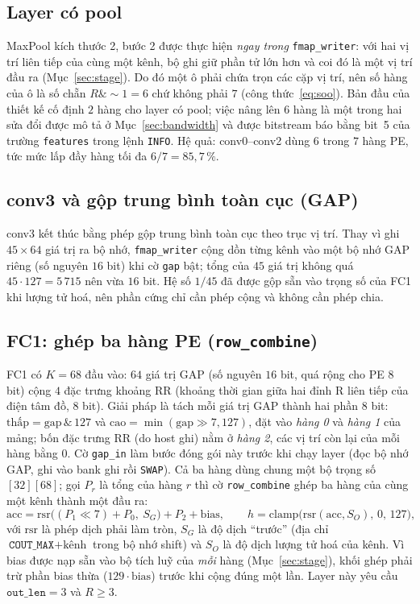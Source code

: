 \subsection{Layer có pool}
MaxPool kích thước 2, bước 2 được thực hiện \emph{ngay trong} \texttt{fmap\_writer}: với hai vị trí liên tiếp của cùng một kênh, bộ ghi giữ phần tử lớn hơn và coi đó là một vị trí đầu ra (Mục~\ref{sec:stage}).
Do đó một ô phải chứa trọn các cặp vị trí, nên số hàng của ô là số chẵn $R\mathbin{\&}{\sim}1=6$ chứ không phải $7$ (công thức~\eqref{eq:soo}).
Bản đầu của thiết kế cố định $2$ hàng cho layer có pool; việc nâng lên $6$ hàng là một trong hai sửa đổi được mô tả ở Mục~\ref{sec:bandwidth} và được bitstream báo bằng bit~5 của trường \texttt{features} trong lệnh \texttt{INFO}.
Hệ quả: conv0--conv2 dùng $6$ trong $7$ hàng PE, tức mức lấp đầy hàng tối đa $6/7=85{,}7\,\%$.

\subsection{conv3 và gộp trung bình toàn cục (GAP)}
conv3 kết thúc bằng phép gộp trung bình toàn cục theo trục vị trí.
Thay vì ghi $45\times64$ giá trị ra bộ nhớ, \texttt{fmap\_writer} cộng dồn từng kênh vào một bộ nhớ GAP riêng (số nguyên $16$ bit) khi cờ \texttt{gap} bật; tổng của $45$ giá trị không quá $45\cdot127=5\,715$ nên vừa $16$ bit.
Hệ số $1/45$ đã được gộp sẵn vào trọng số của FC1 khi lượng tử hoá, nên phần cứng chỉ cần phép cộng và không cần phép chia.

\subsection{FC1: ghép ba hàng PE (\texttt{row\_combine})}
FC1 có $K=68$ đầu vào: $64$ giá trị GAP (số nguyên $16$ bit, quá rộng cho PE $8$ bit) cộng $4$ đặc trưng khoảng RR (khoảng thời gian giữa hai đỉnh R liên tiếp của điện tâm đồ, $8$ bit).
Giải pháp là tách mỗi giá trị GAP thành hai phần $8$ bit: $\text{thấp}=\text{gap}\,\&\,127$ và $\text{cao}=\min(\text{gap}\gg7,127)$, đặt vào \emph{hàng 0} và \emph{hàng 1} của mảng; bốn đặc trưng RR (do host ghi) nằm ở \emph{hàng 2}, các vị trí còn lại của mỗi hàng bằng $0$.
Cờ \texttt{gap\_in} làm bước đóng gói này trước khi chạy layer (đọc bộ nhớ GAP, ghi vào bank ghi rồi \texttt{SWAP}).
Cả ba hàng dùng chung một bộ trọng số $[32][68]$; gọi $P_r$ là tổng của hàng $r$ thì cờ \texttt{row\_combine} ghép ba hàng của cùng một kênh thành một đầu ra:
\begin{equation}\label{eq:rowcombine}
  \mathrm{acc}=\mathrm{rsr}\big((P_1\ll7)+P_0,\ S_G\big)+P_2+\text{bias},\qquad h=\mathrm{clamp}\big(\mathrm{rsr}(\mathrm{acc},S_O),\,0,\,127\big),
\end{equation}
với $\mathrm{rsr}$ là phép dịch phải làm tròn, $S_G$ là độ dịch ``trước'' (địa chỉ $\texttt{COUT\_MAX}+\text{kênh}$ trong bộ nhớ shift) và $S_O$ là độ dịch lượng tử hoá của kênh.
Vì bias được nạp sẵn vào bộ tích luỹ của \emph{mỗi} hàng (Mục~\ref{sec:stage}), khối ghép phải trừ phần bias thừa ($129\cdot\text{bias}$) trước khi cộng đúng một lần.
Layer này yêu cầu $\texttt{out\_len}=3$ và $R\ge3$.

